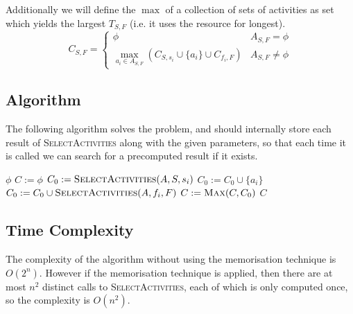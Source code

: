 \documentclass{article}
\begin{document}
Additionally we will define the \(\max\) of a collection of sets of activities as set which yields the largest \(T_{S,F}\) (i.e. it uses the resource for longest).
\begin{equation*}
	C_{S,F} =
	\begin{cases}
		\phi                                                                                       & A_{S,F} = \phi    \\
		\displaystyle\max_{a_i \in A_{S,F}} \left( C_{S, s_i} \cup \{a_i\} \cup C_{f_i, F} \right) & A_{S,F} \neq \phi
	\end{cases}
\end{equation*}

\subsection{Algorithm}

The following algorithm solves the problem, and should internally store each result of \textsc{SelectActivities} along with the given parameters, so that each time it is called we can search for a precomputed result if it exists.

\begin{algorithm}
	\begin{algorithmic}
		 \Return \(\phi\) \EndIf
		\State \(C := \phi\)
		\State \(C_0 := \Call{SelectActivities}{A, S, s_i}\)
		\State \(C_0 := C_0 \cup \{a_i\}\)
		\State \(C_0 := C_0 \cup \Call{SelectActivities}{A, f_i, F}\)
		\State \(C := \Call{Max}{C, C_0}\)
		\EndFor
		\State \Return \(C\)
		\EndFunction
	\end{algorithmic}
\end{algorithm}

\subsection{Time Complexity}

The complexity of the algorithm without using the memorisation technique is \(O(2^n)\). However if the memorisation technique is applied, then there are at most \(n^2\) distinct calls to \textsc{SelectActivities}, each of which is only computed once, so the complexity is \(O(n^2)\).
\end{document}
